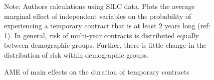 \documentclass[12pt]{article}
\begin{document}
\clearpage
\begin{figure}
    \caption{AME of main effects on the duration of temporary contracts}
    \label{graph_glm_mfx_dur}
    \footnotesize{Note: Authors calculations using SILC data.  Plots the average marginal effect of independent variables on the probability of experiencing a temporary contract that is at least 2 years long (ref: 1). In general, risk of multi-year contracts is distributed equally between demographic groups.  Further, there is little change in the distribution of risk within demographic groups.}
\end{figure}


\clearpage
\appendix
\setcounter{table}{0}
\setcounter{figure}{0}
\renewcommand*\thetable{\Alph{section}.\arabic{table}}
\renewcommand*\thefigure{\Alph{section}.\arabic{figure}}
\renewcommand{\theHfigure}{\Alph{section}.\arabic{table}}
\renewcommand{\theHtable}{\Alph{section}.\arabic{figure}}


\end{document}
